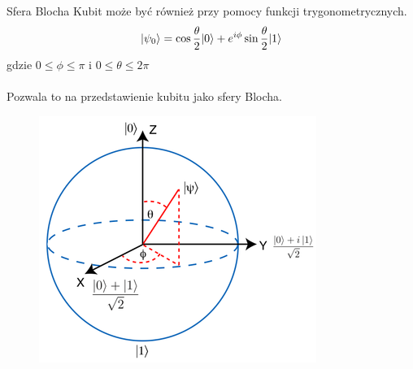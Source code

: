 \documentclass{beamer}
\DeclarePairedDelimiter\ket{\lvert}{\rangle}
\begin{document}
	
	\begin{frame}{}
		\begin{block}{Sfera Blocha}
			\vspace{0.5em}
			Kubit może być również przy pomocy funkcji trygonometrycznych.
			\begin{equation*}
			\ket{\psi_{0}} = \cos{\frac{\theta}{2}}\ket{0} + e^{i\phi}\sin{\frac{\theta}{2}}\ket{1} 
			\end{equation*}
			gdzie $0\leq\phi\leq\pi$ i $0\leq\theta\leq2\pi$\\~\\
			Pozwala to na przedstawienie kubitu jako sfery Blocha.
			\vspace{0.5em}
		\end{block}
		\begin{figure}[hbt!]
			\centering
			\includegraphics[scale=0.8]{media/bloch.png}
		\end{figure}		
	\end{frame}
\end{document}
